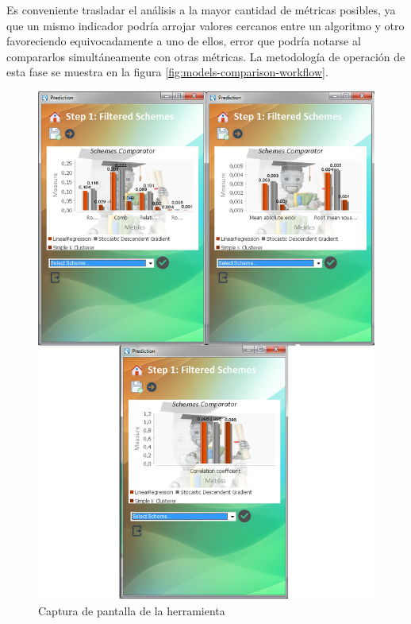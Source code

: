 Es conveniente trasladar el análisis a la mayor cantidad de métricas
posibles, ya que un mismo indicador podría arrojar valores cercanos
entre un algoritmo y otro favoreciendo equivocadamente a uno de ellos,
error que podría notarse al compararlos simultáneamente con otras
métricas. La metodología de operación de esta fase se muestra en la
figura \ref{fig:models-comparison-workflow}. 

\begin{figure}
\begin{centering}
\includegraphics[scale=0.45]{images/errors_screenshot}
\par\end{centering}

\caption{Captura de pantalla de la herramienta \label{fig:models-comparison-workflow-1}}
\end{figure}


